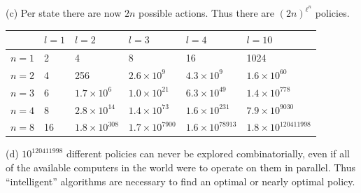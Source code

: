 \documentclass[10pt]{book}
\begin{document}
(c) Per state there are now $2 n$ possible actions. Thus there are $(2 n)^{\ell^{n}}$ policies.
\begin{tabular}{|l|l|l|l|l|l|}
\hline & $l=1$ & $l=2$ & $l=3$ & $l=4$ & $l=10$ \\
\hline $n=1$ & 2 & 4 & 8 & 16 & 1024 \\
\hline $n=2$ & 4 & 256 & $2.6 \times 10^{9}$ & $4.3 \times 10^{9}$ & $1.6 \times 10^{60}$ \\
\hline $n=3$ & 6 & $1.7 \times 10^{6}$ & $1.0 \times 10^{21}$ & $6.3 \times 10^{49}$ & $1.4 \times 10^{778}$ \\
\hline $n=4$ & 8 & $2.8 \times 10^{14}$ & $1.4 \times 10^{73}$ & $1.6 \times 10^{231}$ & $7.9 \times 10^{9030}$ \\
\hline $n=8$ & 16 & $1.8 \times 10^{308}$ & $1.7 \times 10^{7900}$ & $1.6 \times 10^{78913}$ & $1.8 \times 10^{120411998}$ \\
\hline
\end{tabular}

(d) $10^{120411998}$ different policies can never be explored combinatorially, even if all of the available computers in the world were to operate on them in parallel. Thus “intelligent” algorithms are necessary to find an optimal or nearly optimal policy.
\end{document}
